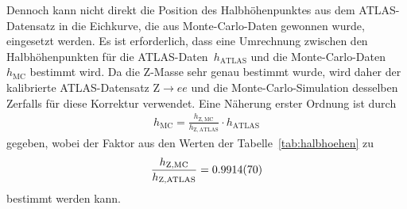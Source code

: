 \documentclass[11pt, a4paper]{article}
\numberwithin{equation}{section}
\begin{document}
Dennoch kann nicht direkt die Position des Halbhöhenpunktes aus dem ATLAS-Datensatz in die Eichkurve, die aus Monte-Carlo-Daten gewonnen wurde, eingesetzt werden.
Es ist erforderlich, dass eine Umrechnung zwischen den Halbhöhenpunkten für die ATLAS-Daten~$h_\mathrm{ATLAS}$ und die Monte-Carlo-Daten~$h_\mathrm{MC}$ bestimmt wird.
Da die Z-Masse sehr genau bestimmt wurde, wird daher der kalibrierte ATLAS-Datensatz $\mathrm{Z} \rightarrow ee$ und die Monte-Carlo-Simulation desselben Zerfalls für diese Korrektur verwendet.
Eine Näherung erster Ordnung ist durch
\begin{align*}
	h_\mathrm{MC} = \frac{h_{\mathrm{Z, MC}}}{h_{\mathrm{Z, ATLAS}}} \cdot h_\mathrm{ATLAS}
\end{align*}
gegeben, wobei der Faktor aus den Werten der Tabelle~\ref{tab:halbhoehen} zu
\begin{align*}
	\frac{h_{\mathrm{Z, MC}}}{h_{\mathrm{Z, ATLAS}}} = \num{0.9914 +- 0.0070}
\end{align*}
bestimmt werden kann.
\end{document}
